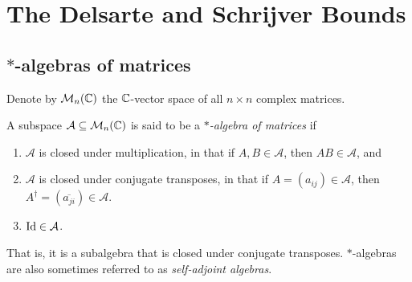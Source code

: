 
\section{The Delsarte and Schrijver Bounds}

\subsection{$*$-algebras of matrices}

	Denote by $\mathcal{M}_n(\mathbb{C})$ the $\mathbb{C}$-vector space of all $n \times n$ complex matrices.

	\begin{fdef}
		A subspace $\mathcal{A} \subseteq \mathcal{M}_n(\mathbb{C})$ is said to be a \emph{$*$-algebra of matrices} if
		\begin{enumerate}
			\item $\mathcal{A}$ is closed under multiplication, in that if $A,B \in \mathcal{A}$, then $AB \in \mathcal{A}$, and
			\item $\mathcal{A}$ is closed under conjugate transposes, in that if $A = (a_{ij}) \in \mathcal{A}$, then $A^\dagger = (\overline{a_{ji}}) \in \mathcal{A}$.
			\item $\operatorname{Id} \in \mathcal{A}$.
		\end{enumerate}
	\end{fdef}

	That is, it is a subalgebra that is closed under conjugate transposes. $*$-algebras are also sometimes referred to as \emph{self-adjoint algebras}.\\

